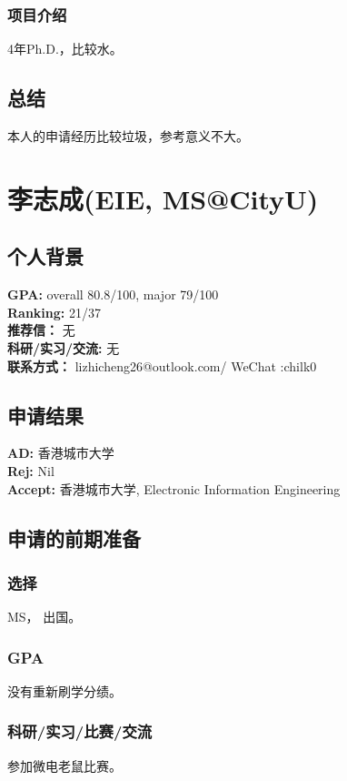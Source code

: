\documentclass[a4paper,UTF8]{book}
\begin{document}
        \subsubsection*{项目介绍}
        4年Ph.D.，比较水。

    \subsection*{总结}
    本人的申请经历比较垃圾，参考意义不大。

\clearpage
\section{李志成(EIE, MS@CityU)}
    \subsection*{个人背景}
        \textbf{GPA:} overall 80.8/100, major 79/100\\
        \textbf{Ranking:} 21/37\\
        \textbf{推荐信：} 无\\
        \textbf{科研/实习/交流:} 无\\ 
        \textbf{联系方式：} lizhicheng26@outlook.com/ WeChat :chilk0

    \subsection*{申请结果}
        \textbf{AD:} 香港城市大学\\
        \textbf{Rej:} Nil\\
        \textbf{Accept:} 香港城市大学, Electronic Information Engineering

    \subsection*{申请的前期准备}
        \subsubsection*{选择}
        MS， 出国。
        \subsubsection*{GPA}
        没有重新刷学分绩。
        \subsubsection*{科研/实习/比赛/交流}
        参加微电老鼠比赛。
\end{document}
